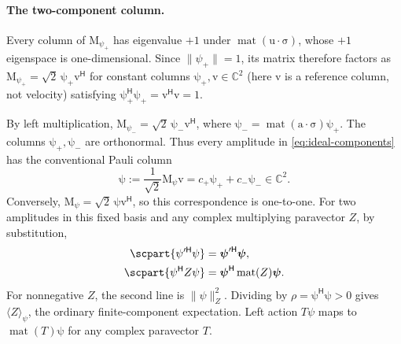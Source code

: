 \documentclass[11pt]{article}
\newcommand{\pv}[1]{{#1}}
\newcommand{\pvGreek}[1]{{#1}}
\newcommand{\vstyle}[1]{{\bm{\mathrm{#1}}}}
\newcommand{\pT}{\pv{T}}
\newcommand{\pZ}{\pv{Z}}
\newcommand{\pvpsi}{\pvGreek{\psi}}
\numberwithin{equation}{section}
\newcommand{\C}{\mathbb{C}}
\newcommand{\dotprod}{\cdot}
\newcommand{\bsig}{\vstyle{\sigma}}
\newcommand{\bu}{\vstyle{u}}
\newcommand{\ba}{\vstyle{a}}
\newcommand{\bM}{\vstyle{M}}
\newcommand{\bpsi}{\vstyle{\psi}}
\begin{document}
\paragraph{The two-component column.}
Every column of $\bM_{\pvpsi_+}$ has eigenvalue $+1$ under
$\operatorname{mat}(\bu\dotprod\bsig)$, whose $+1$ eigenspace is
one-dimensional.  Since $\lVert\pvpsi_+\rVert=1$, its matrix therefore
factors as $\bM_{\pvpsi_+}=\sqrt2\,\bpsi_+\vstyle{v}^{\mathsf H}$ for
constant columns $\bpsi_+,\vstyle{v}\in\C^2$ (here $\vstyle{v}$ is a reference column, not velocity) satisfying
$\bpsi_+^{\mathsf H}\bpsi_+=\vstyle{v}^{\mathsf H}\vstyle{v}=1$.

By left multiplication,
\mbox{$\bM_{\pvpsi_-}=\sqrt2\,\bpsi_-\vstyle{v}^{\mathsf H}$}, where
$\bpsi_-=\operatorname{mat}(\ba\dotprod\bsig)\bpsi_+$.
The columns $\bpsi_+,\bpsi_-$ are orthonormal.  Thus every amplitude
in \eqref{eq:ideal-components} has the conventional Pauli column
\begin{equation*}
 \bpsi:=\frac1{\sqrt2}\bM_\pvpsi\vstyle{v}
 =c_+\bpsi_++c_-\bpsi_-\in\C^2.
\end{equation*}
Conversely, $\bM_\pvpsi=\sqrt2\,\bpsi\vstyle{v}^{\mathsf H}$, so this
correspondence is one-to-one.  For two amplitudes in this fixed basis
and any complex multiplying paravector $\pZ$, by substitution,
\begin{align*}
 \scpart{\pvpsi'^{\mathsf H}\pvpsi}&=\bpsi'^{\mathsf H}\bpsi,\\
 \scpart{\pvpsi^{\mathsf H}\pZ\pvpsi}
 &=\bpsi^{\mathsf H}\operatorname{mat}(\pZ)\bpsi.
\end{align*}
For nonnegative $\pZ$, the second line is $\lVert\pvpsi\rVert_\pZ^2$.
Dividing by $\rho=\bpsi^{\mathsf H}\bpsi>0$ gives
$\langle \pZ\rangle_\pvpsi$, the ordinary finite-component expectation.
Left action $\pT\pvpsi$ maps to $\operatorname{mat}(\pT)\bpsi$ for any complex paravector $\pT$.
\end{document}
